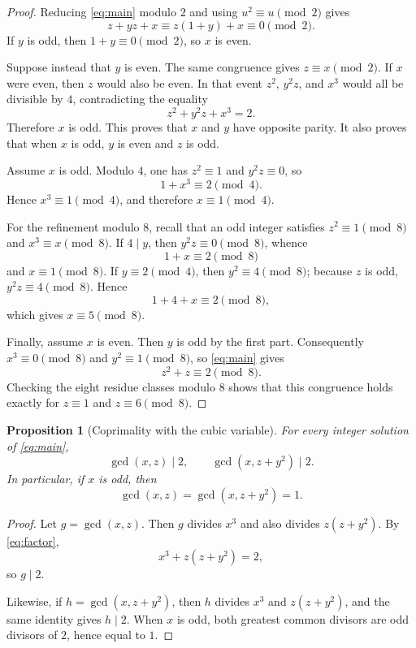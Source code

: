 \documentclass[11pt,a4paper]{amsart}
\newtheorem{proposition}[theorem]{Proposition}
\theoremstyle{remark}
\begin{document}
\begin{proof}
Reducing \eqref{eq:main} modulo $2$ and using $u^2\equiv u\pmod2$ gives
\[
 z+yz+x\equiv z(1+y)+x\equiv0\pmod2.
\]
If $y$ is odd, then $1+y\equiv0\pmod2$, so $x$ is even.

Suppose instead that $y$ is even.  The same congruence gives $z\equiv x\pmod2$.  If $x$ were even, then $z$ would also be even.  In that event $z^2$, $y^2z$, and $x^3$ would all be divisible by $4$, contradicting the equality
\[
 z^2+y^2z+x^3=2.
\]
Therefore $x$ is odd.  This proves that $x$ and $y$ have opposite parity.  It also proves that when $x$ is odd, $y$ is even and $z$ is odd.

Assume $x$ is odd.  Modulo $4$, one has $z^2\equiv1$ and $y^2z\equiv0$, so
\[
 1+x^3\equiv2\pmod4.
\]
Hence $x^3\equiv1\pmod4$, and therefore $x\equiv1\pmod4$.

For the refinement modulo $8$, recall that an odd integer satisfies $z^2\equiv1\pmod8$ and $x^3\equiv x\pmod8$.  If $4\mid y$, then $y^2z\equiv0\pmod8$, whence
\[
 1+x\equiv2\pmod8
\]
and $x\equiv1\pmod8$.  If $y\equiv2\pmod4$, then $y^2\equiv4\pmod8$; because $z$ is odd, $y^2z\equiv4\pmod8$.  Hence
\[
 1+4+x\equiv2\pmod8,
\]
which gives $x\equiv5\pmod8$.

Finally, assume $x$ is even.  Then $y$ is odd by the first part.  Consequently $x^3\equiv0\pmod8$ and $y^2\equiv1\pmod8$, so \eqref{eq:main} gives
\[
 z^2+z\equiv2\pmod8.
\]
Checking the eight residue classes modulo $8$ shows that this congruence holds exactly for $z\equiv1$ and $z\equiv6\pmod8$.
\end{proof}

\begin{proposition}[Coprimality with the cubic variable]\label{prop:gcd}
For every integer solution of \eqref{eq:main},
\begin{equation}\label{eq:gcd-bounds}
 \gcd(x,z)\mid2,
 \qquad
 \gcd(x,z+y^2)\mid2.
\end{equation}
In particular, if $x$ is odd, then
\[
 \gcd(x,z)=\gcd(x,z+y^2)=1.
\]
\end{proposition}

\begin{proof}
Let $g=\gcd(x,z)$.  Then $g$ divides $x^3$ and also divides $z(z+y^2)$.  By \eqref{eq:factor},
\[
 x^3+z(z+y^2)=2,
\]
so $g\mid2$.

Likewise, if $h=\gcd(x,z+y^2)$, then $h$ divides $x^3$ and $z(z+y^2)$, and the same identity gives $h\mid2$.  When $x$ is odd, both greatest common divisors are odd divisors of $2$, hence equal to $1$.
\end{proof}
\end{document}
